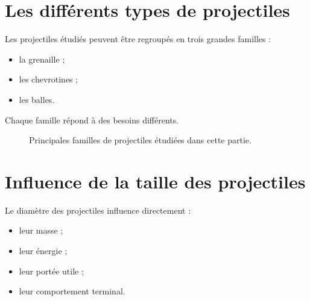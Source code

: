 \section{Les différents types de projectiles}

Les projectiles étudiés peuvent être regroupés en trois grandes familles :

\begin{itemize}
    \item la grenaille ;
    \item les chevrotines ;
    \item les balles.
\end{itemize}

Chaque famille répond à des besoins différents.

\begin{figure}[htbp]
\centering


\caption{Principales familles de projectiles étudiées dans cette partie.}
\label{fig:famille_projectiles}

\end{figure}

\section{Influence de la taille des projectiles}

Le diamètre des projectiles influence directement :

\begin{itemize}
    \item leur masse ;
    \item leur énergie ;
    \item leur portée utile ;
    \item leur comportement terminal.
\end{itemize}


